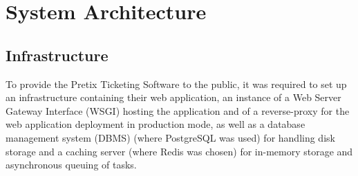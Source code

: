 \documentclass[12pt]{article}
\begin{document}



\newpage
\section{System Architecture} \label{architecture} %

\subsection{Infrastructure} \label{architecture.infrastructure} %


To provide the Pretix Ticketing Software \cite{pretix} to the public, it was required to set up an infrastructure containing their web application, an instance 
of a Web Server Gateway Interface (WSGI) hosting the application and of a reverse-proxy for the web application deployment in production mode, as well as a 
database management system (DBMS) (where PostgreSQL was used) for handling disk storage and a caching server (where Redis was chosen) for in-memory storage and 
asynchronous queuing of tasks.
\end{document}
